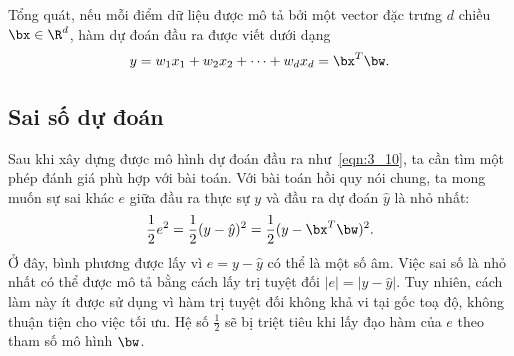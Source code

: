



Tổng quát, nếu mỗi điểm dữ liệu được mô tả bởi một vector đặc trưng $d$ chiều $\bx \in \R^d$, hàm dự đoán đầu ra được viết dưới dạng
\begin{equation}
\label{eqn:3_10}
    y = w_1x_1 + w_2x_2 + \dots + w_dx_d = \bx^T\bw.
\end{equation}

\subsection{Sai số dự đoán}
Sau khi xây dựng được mô hình dự đoán đầu ra như~\eqref{eqn:3_10}, ta cần tìm
một phép đánh giá phù hợp với bài toán. Với bài toán hồi quy nói chung, ta
mong muốn sự sai khác $e$ giữa đầu ra thực sự $y$ và đầu ra dự đoán
$\hat{y}$ là nhỏ nhất:
\begin{equation}
    \frac{1}{2}e^2 = \frac{1}{2}(y - \hat{y})^2 =
    \frac{1}{2}(y - \bx^T\bw)^2.
\end{equation}
Ở đây, bình phương được lấy vì $e = y - \hat{y}$ có thể là một số âm. Việc sai số
là nhỏ nhất có thể được mô tả bằng cách lấy trị tuyệt đối $|e| = |y - \hat{y}|$.
Tuy nhiên, cách làm này ít được sử dụng vì hàm trị tuyệt đối không khả vi tại
gốc toạ độ, không thuận tiện cho việc tối ưu. Hệ số $\frac{1}{2}$ sẽ bị
triệt tiêu khi lấy đạo hàm của $e$ theo tham số mô hình $\bw$. 



